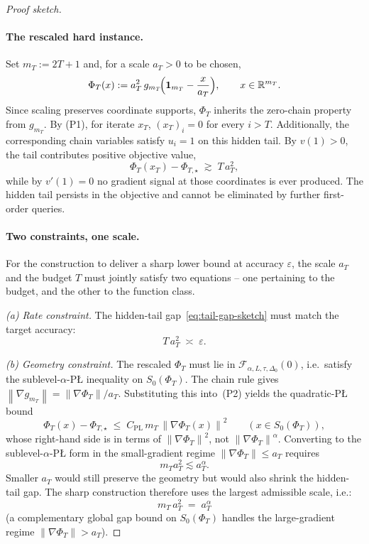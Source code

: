 \documentclass[11pt]{article}
\newcommand{\R}{\mathbb{R}}
\newcommand{\norm}[1]{\left\lVert #1\right\rVert}
\newcommand{\one}{\mathbf{1}}
\begin{document}
\begin{proof}[Proof sketch]
\paragraph{The rescaled hard instance.}
Set \(m_T:=2T+1\) and, for a scale \(a_T>0\) to be chosen,
\[
\Phi_T(x):=a_T^2\,g_{m_T}\!\Bigl(\one_{m_T}-\frac{x}{a_T}\Bigr),
\qquad x\in\R^{m_T}.
\]
Since scaling preserves coordinate supports, \(\Phi_T\) inherits the zero-chain property from \(g_{m_T}\). By (P1), for 
iterate \(x_T\), \((x_T)_i=0\) for every \(i>T\). Additionally, the corresponding chain variables satisfy \(u_i=1\) on
this hidden tail. By \(v(1)>0\), the tail contributes positive objective value,
\begin{equation}
\label{eq:tail-gap-sketch}
\Phi_T(x_T)-\Phi_{T,\star}\;\gtrsim\;T\,a_T^2,
\end{equation}
while by \(v'(1)=0\) no gradient signal at those coordinates is ever produced. The hidden tail persists in the
objective and cannot be eliminated by further first-order queries.

\paragraph{Two constraints, one scale.}
For the construction to deliver a sharp lower bound at accuracy \(\varepsilon\), the scale \(a_T\) and the budget
\(T\) must jointly satisfy two equations -- one pertaining to the budget, and the other to the function class.

\smallskip
\noindent\emph{(a) Rate constraint.} The hidden-tail gap~\eqref{eq:tail-gap-sketch} must match the target accuracy:
\begin{equation}
\label{eq:rate-constraint}
T\,a_T^2\;\asymp\;\varepsilon.
\end{equation}

\smallskip
\noindent\emph{(b) Geometry constraint.} The rescaled \(\Phi_T\) must lie in
\(\mathcal F_{\alpha,L,\tau,\Delta_0}(0)\), i.e.\ satisfy the sublevel-\(\alpha\)-P\L{} inequality on
\(S_0(\Phi_T)\). The chain rule gives \(\norm{\nabla g_{m_T}}=\norm{\nabla\Phi_T}/a_T\). Substituting this into~(P2)
yields the quadratic-P\L{} bound
\begin{equation}
\label{eq:rescaled-qPL}
\Phi_T(x)-\Phi_{T,\star}\;\le\;C_{\mathrm{PL}}\,m_T\,\norm{\nabla\Phi_T(x)}^2
\qquad(x\in S_0(\Phi_T)),
\end{equation}
whose right-hand side is in terms of \(\norm{\nabla\Phi_T}^2\), not \(\norm{\nabla\Phi_T}^\alpha\). Converting to the
sublevel-\(\alpha\)-P\L{} form in the small-gradient regime \(\norm{\nabla\Phi_T}\le a_T\) requires
\[
m_Ta_T^2\lesssim a_T^\alpha.
\]
Smaller \(a_T\) would still preserve the geometry but would also shrink the hidden-tail gap. The sharp construction
therefore uses the largest admissible scale, i.e.:
\begin{equation}
\label{eq:matching}
\boxed{\;m_T\,a_T^{2}\;=\;a_T^{\alpha}\;}
\end{equation}
(a complementary global gap bound on \(S_0(\Phi_T)\) handles the large-gradient regime
\(\norm{\nabla\Phi_T}>a_T\)).


\end{proof}
\end{document}
